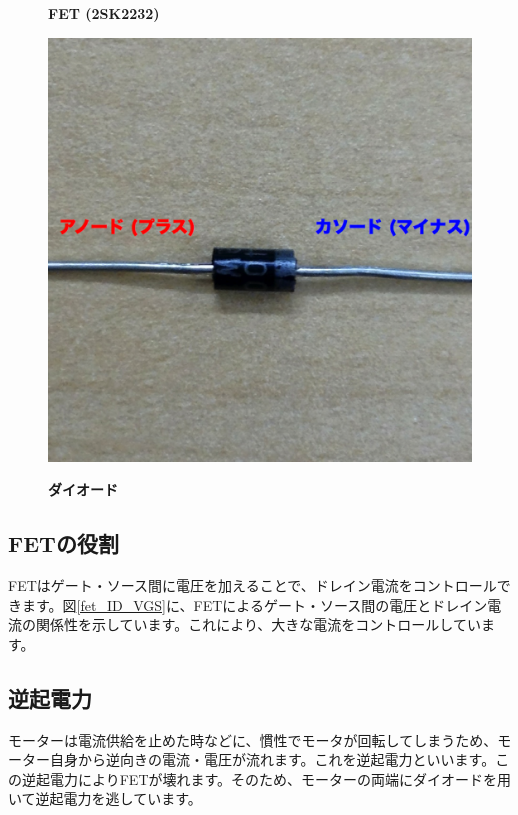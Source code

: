\documentclass[11pt,a4paper]{jarticle}
\begin{document}
\begin{figure}[h!]
\begin{minipage}{0.32\columnwidth}
  \begin{center}
   \textbf{FET (2SK2232)}
  \end{center}
 \end{minipage}
 \begin{minipage}{0.32\columnwidth}
  \centering
  \includegraphics[width=\columnwidth]{img/diode.eps}
  \begin{center}
   \textbf{ダイオード}
  \end{center}
 \end{minipage}
\end{figure}

\subsection*{FETの役割}
FETはゲート・ソース間に電圧を加えることで、ドレイン電流をコントロールできます。図\ref{fet_ID_VGS}に、FETによるゲート・ソース間の電圧とドレイン電流の関係性を示しています。これにより、大きな電流をコントロールしています。

\subsection*{逆起電力}
モーターは電流供給を止めた時などに、慣性でモータが回転してしまうため、モーター自身から逆向きの電流・電圧が流れます。これを逆起電力といいます。この逆起電力によりFETが壊れます。そのため、モーターの両端にダイオードを用いて逆起電力を逃しています。
\end{document}

